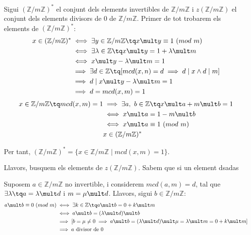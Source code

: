 Sigui $(\mathbb{Z} / m \mathbb{Z})^*$ el conjunt dels elements invertibles de $\mathbb{Z} / m \mathbb{Z}$ i $z(\mathbb{Z} / m \mathbb{Z})$ el conjunt dels elements divisors de 0 de $\mathbb{Z} / m \mathbb{Z}$. Primer de tot trobarem els elements de $(\mathbb{Z} / m \mathbb{Z})^*$:
\[\begin{aligned}
	x \in (\mathbb{Z} / m \mathbb{Z})^* 	& \iff \exists y \in \mathbb{Z} / m \mathbb{Z} \tq x \mult y \equiv 1\ (mod\ m) \\
						& \iff \exists \lambda \in \mathbb{Z} \tq x \mult y = 1 + \lambda \mult m \\
						& \iff x \mult y - \lambda \mult m = 1 \\
						& \implies \exists d \in \mathbb{Z} \tq [mcd(x, n) = d \implies d \mid x \land d \mid m] \\
						& \implies d \mid x \mult y - \lambda \mult m = 1 \\
						& \implies d = mcd(x, m) = 1
\end{aligned}\]
\[\begin{aligned}
	x \in \mathbb{Z} / m \mathbb{Z} \tq mcd(x, m) = 1	& \implies \exists a,\ b \in \mathbb{Z} \tq x \mult a + m \mult b = 1 \\
								& \iff x \mult a = 1 - m \mult b \\
								& \iff x \mult a \equiv 1\ (mod\ m) \\
								& x \in (\mathbb{Z} / m \mathbb{Z})^*
\end{aligned}\]

Per tant, $(\mathbb{Z} / m \mathbb{Z})^* = \{x \in \mathbb{Z} / m \mathbb{Z} \mid mcd(x, m) = 1\}$.\medskip

Llavors, busquem els elements de $z(\mathbb{Z} / m \mathbb{Z})$. Sabem que si un element dsadas

Suposem $a \in \mathbb{Z} / m \mathbb{Z} \text{ no invertible}$, i considerem $mcd(a, m) = d$, tal que $\exists \lambda \tq a = \lambda \mult d$ i  $m = \mu  \mult d$. Llavors, sigui $b \in \mathbb{Z} / m \mathbb{Z}$:
\[\begin{aligned}
	a \mult b \equiv 0\ (mod\ m)	& \iff \exists k \in \mathbb{Z} \tq a \mult b = 0 + k \mult m \\
					& \iff a \mult b = (\lambda \mult d) \mult b \\
					& \implies [b = \mu \neq 0 \implies a \mult b = (\lambda \mult d) \mult \mu = \lambda \mult m  = 0 + k \mult m] \\
					& \implies a \text{ divisor de 0}
\end{aligned}\]

